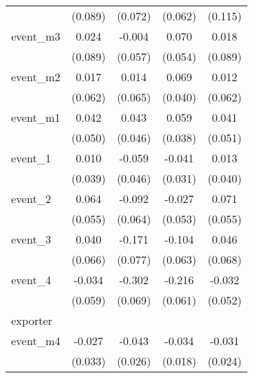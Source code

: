 \begin{table}[htbp]
\begin{tabular}{l*{4}{c}}
            &     (0.089)         &     (0.072)         &     (0.062)         &     (0.115)         \\
[1em]
event\_m3    &       0.024         &      -0.004         &       0.070         &       0.018         \\
            &     (0.089)         &     (0.057)         &     (0.054)         &     (0.089)         \\
[1em]
event\_m2    &       0.017         &       0.014         &       0.069         &       0.012         \\
            &     (0.062)         &     (0.065)         &     (0.040)         &     (0.062)         \\
[1em]
event\_m1    &       0.042         &       0.043         &       0.059         &       0.041         \\
            &     (0.050)         &     (0.046)         &     (0.038)         &     (0.051)         \\
[1em]
event\_1     &       0.010         &      -0.059         &      -0.041         &       0.013         \\
            &     (0.039)         &     (0.046)         &     (0.031)         &     (0.040)         \\
[1em]
event\_2     &       0.064         &      -0.092         &      -0.027         &       0.071         \\
            &     (0.055)         &     (0.064)         &     (0.053)         &     (0.055)         \\
[1em]
event\_3     &       0.040         &      -0.171\sym{*}  &      -0.104         &       0.046         \\
            &     (0.066)         &     (0.077)         &     (0.063)         &     (0.068)         \\
[1em]
event\_4     &      -0.034         &      -0.302\sym{***}&      -0.216\sym{***}&      -0.032         \\
            &     (0.059)         &     (0.069)         &     (0.061)         &     (0.052)         \\
\hline
exporter    &                     &                     &                     &                     \\
event\_m4    &      -0.027         &      -0.043         &      -0.034         &      -0.031         \\
            &     (0.033)         &     (0.026)         &     (0.018)         &     (0.024)         \\

\end{tabular}
\end{table}
